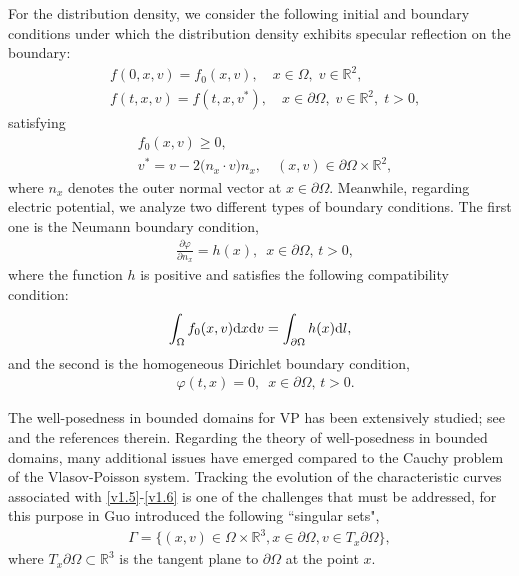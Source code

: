 \documentclass[11pt,reqno]{amsart}%
\theoremstyle{definition}
\theoremstyle{remark}
\begin{document}
 For the distribution density, we consider the following initial and boundary conditions under which the distribution density exhibits specular reflection on the boundary:
   \begin{align}
&f(0,x,v)=f_{0}(x,v),\quad x\in \Omega,\; v\in \mathbb{R}^{2}, \label{v1.8}\\
&f(t,x,v)=f(t,x,v^{*}),\quad x\in \partial\Omega, \; v\in \mathbb{R}^{2},\; t>0, \label{v1.9}
\end{align}
 satisfying 
 \begin{align}
 &f_{0}(x,v)\geq 0,  \label{v1.10}\\
 &v^{*}=v-2\big(n_{x}\cdot v\big)n_{x}, \quad (x,v)\in \partial\Omega \times \mathbb{R}^{2}, \label{v1.11}
 \end{align}
 where $n_{x}$ denotes the outer normal vector at $x\in\partial\Omega$.
Meanwhile, regarding electric potential, we analyze two different types of boundary conditions. 
The first one is the Neumann boundary condition,
  \begin{align}
   &\frac{\partial \varphi}{\partial n_{x}}=h(x),\,\,\, x\in \partial \Omega,\,t>0,\label{v1.7}
   \end{align}
where the function $h$  is positive and satisfies the following compatibility condition:
\begin{align}
\int_{\Omega}f_{0}(x,v){\rm d}x{\rm d}v=\int_{\partial\Omega}h(x){\rm d}l, \label{v1.12}
\end{align}
and the second is the homogeneous Dirichlet boundary condition,
 \begin{align}
   & \varphi (t,x)=0,\,\,\, x\in \partial \Omega,\,t>0.\label{vD1.7}
 \end{align}
   
The well-posedness in bounded domains for VP has been extensively studied; see \cite{C,D,G1,G2,H1,HJV,HV,HV1,LM} and the references therein. 
Regarding the theory of well-posedness in bounded domains, many additional issues have emerged compared to the Cauchy problem of the Vlasov-Poisson system. Tracking the evolution of the characteristic curves associated with \eqref{v1.5}-\eqref{v1.6} is one of the challenges that must be addressed, for this purpose
in \cite{G2} Guo introduced the following ``singular sets",
\begin{align}
 \Gamma=\big\{(x,v)\in\Omega\times\mathbb{R}^{3}, x\in \partial\Omega,v\in T_{x}\partial\Omega\big\},   \label{v1.13}
\end{align}
 where $T_{x}\partial\Omega\subset \mathbb{R}^{3}$ is the tangent plane to $\partial\Omega$ at the point $x$.
\end{document}
